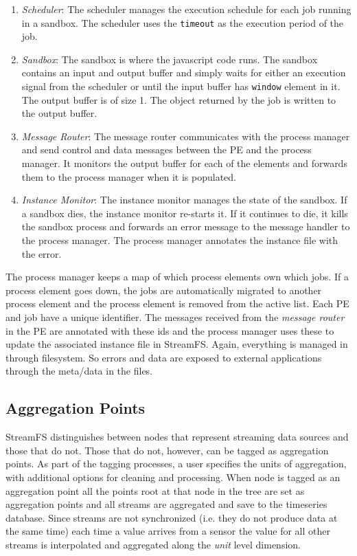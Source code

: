 \begin{enumerate}
\item \emph{Scheduler}: The scheduler manages the execution schedule for each job running in a sandbox.  The scheduler uses
the \texttt{timeout} as the execution period of the job.

\item \emph{Sandbox}:  The sandbox is where the javascript code runs.  The sandbox contains an input and output buffer and simply 
waits for either an execution signal from the scheduler or until the input buffer has \texttt{window} element in it.  The output
buffer is of size 1.  The object returned by the job is written to the output buffer.

\item \emph{Message Router}:  The message router communicates with the process manager and send control and data messages between
the PE and the process manager.  It monitors the output buffer for each of the elements and forwards them to the process manager 
when it is populated.

\item \emph{Instance Monitor}:  The instance monitor manages the state of the sandbox.  If a sandbox dies, the instance monitor re-starts
it.  If it continues to die, it kills the sandbox process and forwards an error message to the message handler to the process manager.
The process manager annotates the instance file with the error.

\end{enumerate}


The process manager keeps a map of which process elements own which jobs.  If a process element goes down, the jobs are automatically
migrated to another process element and the process element is removed from the active list.  Each PE and job have a unique identifier.
The messages received from the \emph{message router} in the PE are annotated with these ids and the process manager uses these
to update the associated instance file in StreamFS.  Again, everything is managed in through filesystem.  So errors and data
are exposed to external applications through the meta/data in the files.


\subsection{Aggregation Points}
\label{sec:aggpts}
StreamFS distinguishes between nodes that represent streaming data sources and those that do not.  Those that do not, 
however, can be tagged as aggregation points.  As part of the tagging processes, a user specifies the units of aggregation, with 
additional options for cleaning and processing.  When node is tagged as an aggregation point all the points root at that
node in the tree are set as aggregation points and all streams are aggregated and save to the timeseries database.
Since streams are not synchronized (i.e. they do not produce data at the same time) each time a value arrives from a
sensor the value for all other streams is interpolated and aggregated along the \emph{unit} level dimension.

